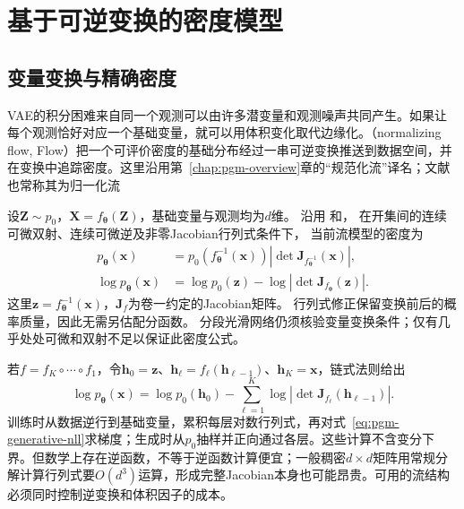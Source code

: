 \section{基于可逆变换的密度模型}
\label{sec:pgm-generative-flows}

\subsection{变量变换与精确密度}
\label{sec:pgm-generative-change-of-variables}

VAE的积分困难来自同一个观测可以由许多潜变量和观测噪声共同产生。如果让每个观测恰好对应一个基础变量，就可以用体积变化取代边缘化。（normalizing flow, Flow）把一个可评价密度的基础分布经过一串可逆变换推送到数据空间，并在变换中追踪密度。这里沿用第~\ref{chap:pgm-overview}章的“规范化流”译名；文献也常称其为归一化流

设$\bm Z\sim p_0$，$\bm X=f_{\bm\theta}(\bm Z)$，基础变量与观测均为$d$维。
沿用
和，
在开集间的连续可微双射、连续可微逆及非零Jacobian行列式条件下，
当前流模型的密度为
\begin{equation}
  \label{eq:pgm-generative-flow-density}
  \begin{aligned}
    p_{\bm{\theta}}(\bm{x})
      &=p_0(f_{\bm{\theta}}^{-1}(\bm{x}))
         \left|\det\bm{J}_{f_{\bm{\theta}}^{-1}}(\bm{x})\right|,\\
    \log p_{\bm{\theta}}(\bm{x})
      &=\log p_0(\bm{z})-
         \log\left|\det\bm{J}_{f_{\bm{\theta}}}(\bm{z})\right|.
  \end{aligned}
\end{equation}
这里$\bm z=f_{\bm\theta}^{-1}(\bm x)$，$\bm J_f$为卷一约定的Jacobian矩阵。
行列式修正保留变换前后的概率质量，因此无需另估配分函数。
分段光滑网络仍须核验变量变换条件；仅有几乎处处可微和双射不足以保证此密度公式。

若$f=f_K\circ\cdots\circ f_1$，令$\bm{h}_0=\bm{z}$、$\bm{h}_{\ell}=f_{\ell}(\bm{h}_{\ell-1})$、$\bm{h}_K=\bm{x}$，链式法则给出
\begin{equation}
  \label{eq:pgm-generative-flow-composition}
  \log p_{\bm{\theta}}(\bm{x})
  =\log p_0(\bm{h}_0)
   -\sum_{\ell=1}^{K}
      \log|\det\bm{J}_{f_{\ell}}(\bm{h}_{\ell-1})|.
\end{equation}
训练时从数据逆行到基础变量，累积每层对数行列式，再对式~\eqref{eq:pgm-generative-nll}求梯度；生成时从$p_0$抽样并正向通过各层。这些计算不含变分下界。但数学上存在逆函数，不等于逆函数计算便宜；一般稠密$d\times d$矩阵用常规分解计算行列式要$O(d^3)$运算，形成完整Jacobian本身也可能昂贵。可用的流结构必须同时控制逆变换和体积因子的成本。

